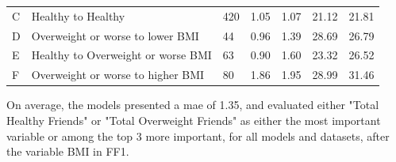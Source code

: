 \begin{table}[H]
\begin{tabular}{lllllll}
{\color[HTML]{000000} C}                                              & {\color[HTML]{000000} Healthy to Healthy}                               & {\color[HTML]{000000} 420}                                                 & {\color[HTML]{000000} 1.05}                                           & {\color[HTML]{000000} 1.07}                                            & {\color[HTML]{000000} 21.12}                                           & {\color[HTML]{000000} 21.81}                                           \\
{\color[HTML]{000000} D}                                              & {\color[HTML]{000000} Overweight or worse to lower BMI}                 & {\color[HTML]{000000} 44}                                                  & {\color[HTML]{000000} 0.96}                                           & {\color[HTML]{000000} 1.39}                                            & {\color[HTML]{000000} 28.69}                                           & {\color[HTML]{000000} 26.79}                                           \\
{\color[HTML]{000000} E}                                              & {\color[HTML]{000000} Healthy to Overweight or worse BMI}               & {\color[HTML]{000000} 63}                                                  & {\color[HTML]{000000} 0.90}                                           & {\color[HTML]{000000} 1.60}                                            & {\color[HTML]{000000} 23.32}                                           & {\color[HTML]{000000} 26.52}                                           \\
{\color[HTML]{000000} F}                                              & {\color[HTML]{000000} Overweight or worse to higher BMI}                & {\color[HTML]{000000} 80}                                                  & {\color[HTML]{000000} 1.86}                                           & {\color[HTML]{000000} 1.95}                                            & {\color[HTML]{000000} 28.99}                                           & {\color[HTML]{000000} 31.46}                                          
\end{tabular}

\label{table:Results3A}

\end{table}

On average, the models presented a \gls{mae} of 1.35, and evaluated either "Total Healthy Friends" or "Total Overweight Friends" as either the most important variable or among the top 3 more important, for all models and datasets, after the variable BMI in FF1.

